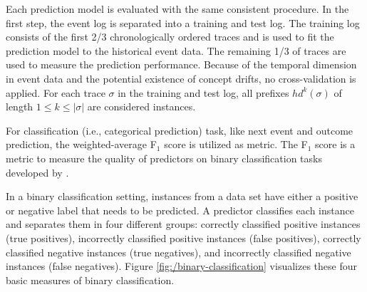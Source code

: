 Each prediction model is evaluated with the same consistent procedure.
In the first step, the event log is separated into a training and test log. 
The training log consists of the first 2/3 chronologically ordered traces and is used to fit the prediction model to the historical event data.
The remaining 1/3 of traces are used to measure the prediction performance.
Because of the temporal dimension in event data and the potential existence of concept drifts, no cross-validation is applied.
For each trace $\sigma$ in the training and test log, all prefixes $hd^k(\sigma)$ of length $1 \leq k \leq |\sigma|$ are considered instances.

For classification (i.e., categorical prediction) task, like next event and outcome prediction, the weighted-average F$_1$ score is utilized as metric.
The F$_1$ score is a metric to measure the quality of predictors on binary classification tasks developed by \citeauthor{DBLP:books/bu/Rijsbergen79} \cite{DBLP:books/bu/Rijsbergen79}.

In a binary classification setting, instances from a data set have either a positive or negative label that needs to be predicted.
A predictor classifies each instance and separates them in four different groups:
correctly classified positive instances (true positives), incorrectly classified positive instances (false positives), correctly classified negative instances (true negatives), and incorrectly classified negative instances (false negatives).
Figure \ref{fig:/binary-classification} visualizes these four basic measures of binary classification.

